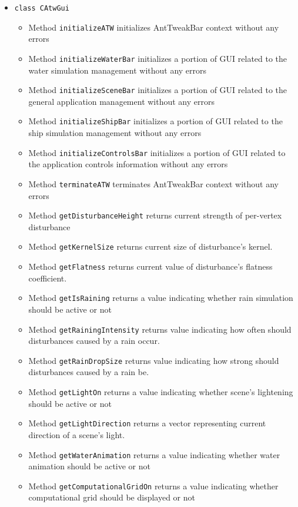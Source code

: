 \documentclass{report}
\begin{document}
\begin{itemize}
%
%
\item \texttt{class CAtwGui}
		\begin{itemize}
			\item Method \texttt{initializeATW} initializes AntTweakBar context without any errors
			\item Method \texttt{initializeWaterBar} initializes a portion of GUI related to the water simulation management without any errors
			\item Method \texttt{initializeSceneBar} initializes a portion of GUI related to the general application management without any errors
			\item Method \texttt{initializeShipBar} initializes a portion of GUI related to the ship simulation management without any errors
			\item Method \texttt{initializeControlsBar} initializes a portion of GUI related to the application controls information without any errors
			\item Method \texttt{terminateATW} terminates AntTweakBar context without any errors
			\item Method \texttt{getDisturbanceHeight} returns current strength of per-vertex disturbance
			\item Method \texttt{getKernelSize} returns current size of disturbance's kernel.
			\item Method \texttt{getFlatness} returns current value of  disturbance's flatness coefficient.
			\item Method \texttt{getIsRaining} returns a value indicating whether rain simulation should be active or not
			\item Method \texttt{getRainingIntensity} returns value indicating how often should disturbances caused by a rain occur.
			\item Method \texttt{getRainDropSize} returns value indicating how strong should disturbances caused by a rain be.	
			\item Method \texttt{getLightOn} returns a value indicating whether scene's lightening should be active or not		
			\item Method \texttt{getLightDirection} returns a vector representing current direction of a scene's light.
			\item Method \texttt{getWaterAnimation} returns a value indicating whether water animation should be active or not	
			\item Method \texttt{getComputationalGridOn} returns a value indicating whether computational grid should be displayed or not
		\end{itemize}
		

\end{itemize}
\end{document}
